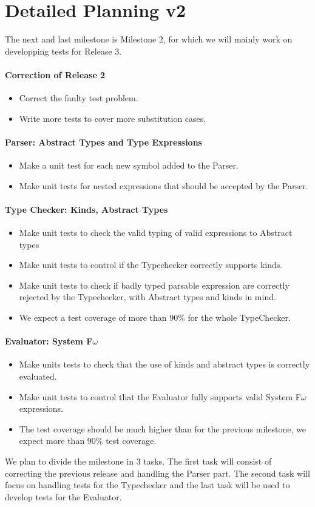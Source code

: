 \documentclass[pdftex,11pt,a4paper]{article}
\begin{document}
\clearpage

\section{Detailed Planning v2} 

The next and last milestone is Milestone 2, for which we will mainly work on developping tests for Release 3.


\paragraph{Correction of Release 2} 
\begin{itemize}
 \item Correct the faulty test problem.
 \item Write more tests to cover more substitution cases.
\end{itemize}

\paragraph{Parser: Abstract Types and Type Expressions}
\begin{itemize}
  \item Make a unit test for each new symbol added to the Parser.
  \item Make unit tests for nested expressions that should be accepted by the Parser.
\end{itemize}

\paragraph{Type Checker: Kinds, Abstract Types}
\begin{itemize}
  \item Make unit tests to check the valid typing of valid expressions to Abstract types
  \item Make unit tests to control if the Typechecker correctly supports kinds.
  \item Make unit tests to check if badly typed parsable expression are correctly rejected by the Typechecker, with Abstract types and kinds in mind. 
  \item We expect a test coverage of more than 90\% for the whole TypeChecker.
\end{itemize}

\paragraph{Evaluator: System F$\omega$  }
\begin{itemize}
  \item Make units tests to check that the use of kinds and abstract types is correctly evaluated.
  \item Make unit tests to control that the Evaluator fully supports valid System F$\omega$ expressions. 
  \item The test coverage should be much higher than for the previous milestone, we expect more than 90\% test coverage.
\end{itemize}

\noindent
We plan to divide the milestone in 3 tasks. The first task will consist of correcting the previous release and handling the Parser part. The second task will focus on handling tests for the Typechecker and the last task 
will be used to develop tests for the Evaluator.
\end{document}
